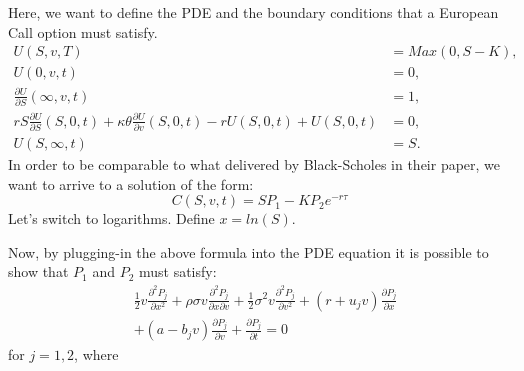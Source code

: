 \documentclass[paper=a4, fontsize=12pt]{scrartcl} %
\numberwithin{equation}{section}
\begin{document}
Here, we want to define the PDE and the boundary conditions that a European Call option must satisfy.
	\begin{equation}
	\begin{aligned}
		U(S, v, T) &= Max(0, S-K),	\\
		U(0, v, t) &= 0,		\\
		\frac{\partial U}{\partial S} (\infty, v, t) &= 1,	\\
		rS \frac{\partial U}{\partial S} (S, 0, t) + \kappa \theta \frac{\partial U}{\partial v}(S, 0, t) 
		-rU(S, 0, t) + U(S, 0, t) &= 0, 	\\
		U(S, \infty, t) &= S.
	\end{aligned}
	\end{equation}
In order to be comparable to what delivered by Black-Scholes in their paper, we want to arrive to a solution of the form:
	\begin{equation}
		C(S, v, t) = SP_1 - KP_2 e^{-r \tau}
	\end{equation}  
Let's switch to logarithms. Define $x = ln(S)$. \par
Now, by plugging-in the above formula into the PDE equation it is possible to show that $P_1$ and $P_2$ must satisfy:
	\begin{equation}
	\begin{aligned}
		& \frac{1}{2} v \frac{\partial^2 P_j}{\partial x^2} + \rho \sigma v \frac{\partial^2 P_j}{\partial x \partial v} + \frac{1}{2}  \sigma^2 v  \frac{\partial^2 P_j}{\partial v^2} + (r + u_j v) \frac{\partial P_j}{\partial x}  \\	
		& +(a - b_j v)  \frac{\partial P_j}{\partial v} + \frac{\partial P_j}{\partial t} = 0
	\end{aligned}
	\end{equation}
for $j=1, 2$, where 
\end{document}
